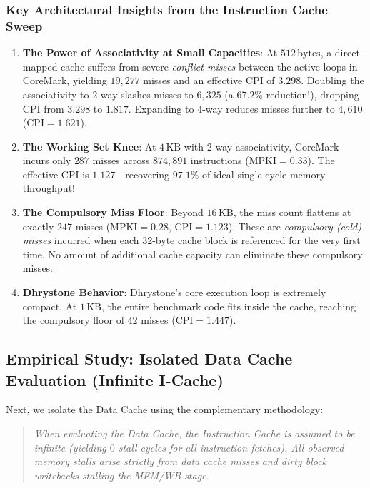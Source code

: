 \subsubsection{Key Architectural Insights from the Instruction Cache Sweep}
\begin{enumerate}
    \item \textbf{The Power of Associativity at Small Capacities}: At $512\,\text{bytes}$, a direct-mapped cache suffers from severe \textit{conflict misses} between the active loops in CoreMark, yielding $19,277$ misses and an effective CPI of $3.298$. Doubling the associativity to $2$-way slashes misses to $6,325$ (a $\mathbf{67.2\%}$ reduction!), dropping CPI from $3.298$ to $1.817$. Expanding to $4$-way reduces misses further to $4,610$ ($\text{CPI} = 1.621$).
    \item \textbf{The Working Set Knee}: At $4\,\text{KB}$ with $2$-way associativity, CoreMark incurs only $287$ misses across $874,891$ instructions ($\text{MPKI} = 0.33$). The effective CPI is $1.127$---recovering $\mathbf{97.1\%}$ of ideal single-cycle memory throughput!
    \item \textbf{The Compulsory Miss Floor}: Beyond $16\,\text{KB}$, the miss count flattens at exactly $247$ misses ($\text{MPKI} = 0.28$, $\text{CPI} = 1.123$). These are \textit{compulsory (cold) misses} incurred when each 32-byte cache block is referenced for the very first time. No amount of additional cache capacity can eliminate these compulsory misses.
    \item \textbf{Dhrystone Behavior}: Dhrystone's core execution loop is extremely compact. At $1\,\text{KB}$, the entire benchmark code fits inside the cache, reaching the compulsory floor of $42$ misses ($\text{CPI} = 1.447$).
\end{enumerate}

\subsection{Empirical Study: Isolated Data Cache Evaluation (Infinite I-Cache)}\label{riscvDcacheStudy}

Next, we isolate the Data Cache using the complementary methodology:
\begin{quote}
\textit{When evaluating the Data Cache, the Instruction Cache is assumed to be infinite (yielding $0$ stall cycles for all instruction fetches). All observed memory stalls arise strictly from data cache misses and dirty block writebacks stalling the MEM/WB stage.}
\end{quote}

